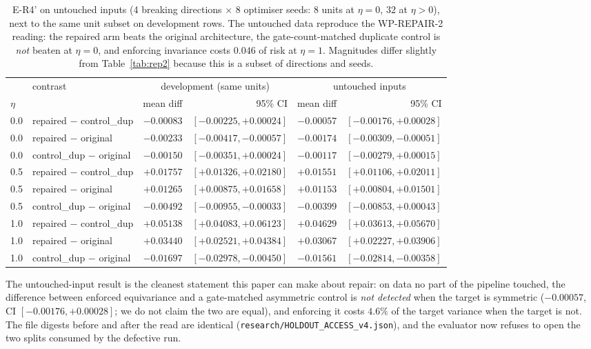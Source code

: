 \documentclass[11pt]{article}
\begin{document}
\begin{table}[t]
\centering
\caption{E-R4' on untouched inputs (4 breaking directions $\times$ $8$ optimiser seeds: $8$
units at $\eta{=}0$, $32$ at $\eta{>}0$), next to the same unit subset on development rows.
The untouched data reproduce the WP-REPAIR-2 reading: the repaired arm beats the original
architecture, the gate-count-matched duplicate control is \emph{not} beaten at $\eta{=}0$,
and enforcing invariance costs $0.046$ of risk at $\eta{=}1$. Magnitudes differ slightly from
Table~\ref{tab:rep2} because this is a subset of directions and seeds.}
\label{tab:er4}
\small
\begin{tabular}{@{}llrrrr@{}}
\toprule
& contrast & \multicolumn{2}{c}{development (same units)} & \multicolumn{2}{c}{untouched inputs} \\
\cmidrule(lr){3-4}\cmidrule(l){5-6}
$\eta$ & & mean diff & 95\% CI & mean diff & 95\% CI \\
\midrule
0.0 & repaired $-$ control\_dup & $-0.00083$ & $[-0.00225,+0.00024]$ & $-0.00057$ & $[-0.00176,+0.00028]$ \\
0.0 & repaired $-$ original & $\mathbf{-0.00233}$ & $[-0.00417,-0.00057]$ & $\mathbf{-0.00174}$ & $[-0.00309,-0.00051]$ \\
0.0 & control\_dup $-$ original & $-0.00150$ & $[-0.00351,+0.00024]$ & $-0.00117$ & $[-0.00279,+0.00015]$ \\
\midrule
0.5 & repaired $-$ control\_dup & $+0.01757$ & $[+0.01326,+0.02180]$ & $+0.01551$ & $[+0.01106,+0.02011]$ \\
0.5 & repaired $-$ original & $+0.01265$ & $[+0.00875,+0.01658]$ & $+0.01153$ & $[+0.00804,+0.01501]$ \\
0.5 & control\_dup $-$ original & $-0.00492$ & $[-0.00955,-0.00033]$ & $-0.00399$ & $[-0.00853,+0.00043]$ \\
\midrule
1.0 & repaired $-$ control\_dup & $+0.05138$ & $[+0.04083,+0.06123]$ & $\mathbf{+0.04629}$ & $[+0.03613,+0.05670]$ \\
1.0 & repaired $-$ original & $+0.03440$ & $[+0.02521,+0.04384]$ & $+0.03067$ & $[+0.02227,+0.03906]$ \\
1.0 & control\_dup $-$ original & $-0.01697$ & $[-0.02978,-0.00450]$ & $-0.01561$ & $[-0.02814,-0.00358]$ \\
\bottomrule
\end{tabular}
\end{table}

The untouched-input result is the cleanest statement this paper can make about repair: on data
no part of the pipeline touched, the difference between enforced equivariance and a
gate-matched asymmetric control is \emph{not detected} when the target is symmetric ($-0.00057$,
CI $[-0.00176,+0.00028]$; we do not claim the two are equal), and enforcing it costs $4.6\%$ of
the target variance when the target is not. The file digests before and after the read are identical
(\texttt{research/HOLDOUT\_ACCESS\_v4.json}), and the evaluator now refuses to open the two
splits consumed by the defective run.
\end{document}
